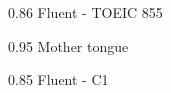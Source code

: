
    {0.86}
    {Fluent - TOEIC 855}
    {}{}{}

    {0.95}
    {Mother tongue}
    {}{}{}

    {0.85}
    {Fluent - C1}
    {}{}{}

%
